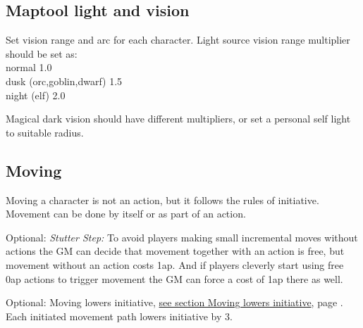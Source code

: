 \subsection*{Maptool light and vision}
Set vision range and arc for each character.
Light source vision range multiplier should be set as:\\
normal 1.0\\
dusk (orc,goblin,dwarf) 1.5\\
night (elf) 2.0


Magical dark vision should have different multipliers, or set a personal self light to suitable radius.






















\subsection*{Moving}
Moving a character is not an action, but it follows the rules of initiative. Movement can be done by itself or as part of an action.

Optional: \emph{Stutter Step:} To avoid players making small incremental moves without actions the GM can decide that movement together with an action is free, but movement without an action costs 1ap. And if players cleverly start using free 0ap actions to trigger movement the GM can force a cost of 1ap there as well.

Optional: Moving lowers initiative, \hyperref[sec:movinglowersinitiative]{see section Moving lowers initiative}, page \pageref{sec:movinglowersinitiative}. Each initiated movement path lowers initiative by 3.


